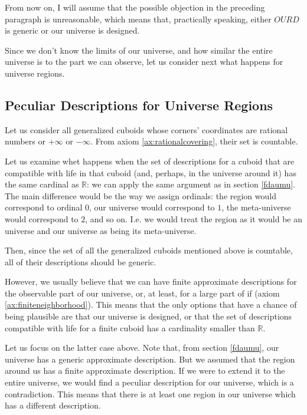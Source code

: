 \documentclass[a4paper
,draft
]{article}
\def\reale{\mathbb{R}}
\def\our_description{OURD}
\begin{document}
From now on, I will assume that the possible objection in the preceding
paragraph is unreasonable, which means that, practically speaking,
either $\our_description$ is generic or our universe is designed.

Since we don't know the limits of our universe, and how similar
the entire universe is to the part we can observe, let us consider next
what happens for universe regions.

\subsection{Peculiar Descriptions for Universe Regions}
\label{sec:peculiarregions}

Let us consider all generalized cuboids whose corners' coordinates are
rational numbers or $+\infty$ or $-\infty$. From axiom
\ref{ax:rationalcovering}, their set is countable.

Let us examine whet happens when the set of descriptions for a cuboid that
are compatible with life in that cuboid (and, perhaps, in the universe
around it) has the same cardinal as $\reale$: we can apply the same argument
as in section \ref{fdaumu}. The main difference would be the way we assign
ordinals: the region would correspond to ordinal $0$, 
our universe would correspond to $1$, the meta-universe would correspond
to $2$, and so on. I.e. we would treat the region as it would be an universe
and our universe as being its meta-universe.

Then, since the set of all the generalized cuboids mentioned above is
countable, all of their descriptions should be generic.

However, we usually believe that we can have finite approximate descriptions
for the observable part of our universe, or, at least, for a large part of if
(axiom \ref{ax:finiteneighborhood}).
This means that the only options
that have a chance of being plausible are that our universe is designed, or
that the set of descriptions compatible with life for a finite cuboid
has a cardinality smaller than $\reale$.

Let us focus on the latter case above.
Note that, from section \ref{fdaumu}, our universe has
a generic approximate description.
But we assumed that the region around us has a finite approximate description.
If we were to extend it to the entire universe, we would find a peculiar
description for our universe, which is a contradiction. This means that there
is at least one region in our universe which has a different description.
\end{document}
